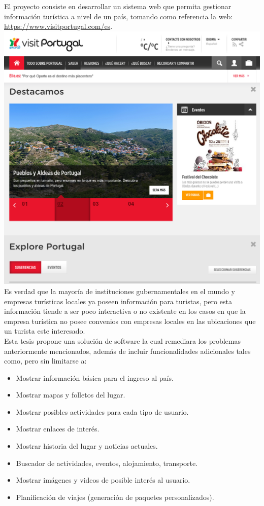 \documentclass{article}
\begin{document}
El proyecto consiste en desarrollar un sistema web que permita gestionar
información turística a nivel de un país, tomando como referencia la web:
\url{https://www.visitportugal.com/es}.\\
\includegraphics[width=\textwidth,height=\textheight,keepaspectratio]{visit-portugal-site.png}
Es verdad que la mayoría de instituciones gubernamentales en el mundo y empresas
turísticas locales ya poseen información para turistas, pero esta información
tiende a ser poco interactiva o no existente en los casos en que la empresa turística
no posee convenios con empresas locales en las ubicaciones que un turista este interesado.\\
Esta tesis propone una solución de software la cual remediara los problemas
anteriormente mencionados, además de incluir funcionalidades adicionales tales como,
pero sin limitarse a:
\begin{itemize}
    \item{Mostrar información básica para el ingreso al país.}
    \item{Mostrar mapas y folletos del lugar.}
    \item{Mostrar posibles actividades para cada tipo de usuario.}
    \item{Mostrar enlaces de interés.}
    \item{Mostrar historia del lugar y noticias actuales.}
    \item{Buscador de actividades, eventos, alojamiento, transporte.}
    \item{Mostrar imágenes y videos de posible interés al usuario.}
    \item{Planificación de viajes (generación de paquetes personalizados).}
\end{itemize}
\end{document}
